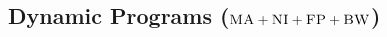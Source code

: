 \documentclass[9pt,twocolumn]{scrartcl}
\newcommand{\VM}{\textsc{VM}}
\newcommand{\Problem}{\textsc{DummyName Problem}}
\newcommand{\carlo}[1]{\textcolor{red}{#1}}
\newcommand{\ChunkType}{\ensuremath{textsc{ct}}}
\newcommand{\achunk}{\ensuremath{c}}
\newcommand{\CC}{\textsc{NI}}
\newcommand{\FP}{\textsc{FP}}
\newcommand{\BW}{\textsc{BW}}
\newcommand{\MA}{\textsc{MA}}
\begin{document}

\subsection{Dynamic Programs ($\MA+\CC+\FP+\BW$)}
\end{document}
